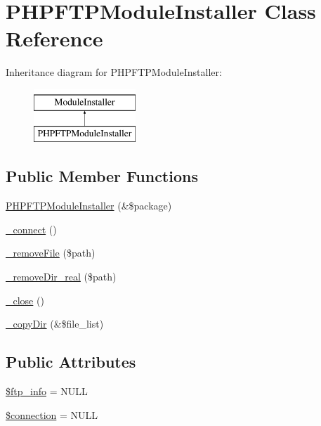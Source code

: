 \hypertarget{classPHPFTPModuleInstaller}{\section{P\-H\-P\-F\-T\-P\-Module\-Installer Class Reference}
\label{classPHPFTPModuleInstaller}
}
Inheritance diagram for P\-H\-P\-F\-T\-P\-Module\-Installer\-:\begin{figure}[H]
\begin{center}
\leavevmode
\includegraphics[height=2.000000cm]{classPHPFTPModuleInstaller}
\end{center}
\end{figure}
\subsection*{Public Member Functions}
\begin{DoxyCompactItemize}
\item 
\hyperlink{classPHPFTPModuleInstaller_a8bd8f79d6614af9e7d28ee497dc9eea1}{P\-H\-P\-F\-T\-P\-Module\-Installer} (\&\$package)
\item 
\hyperlink{classPHPFTPModuleInstaller_a17bd035c8cc7030a56feedf6562de616}{\-\_\-connect} ()
\item 
\hyperlink{classPHPFTPModuleInstaller_a6bfd41813d9f70b9e2ee06deb709742f}{\-\_\-remove\-File} (\$path)
\item 
\hyperlink{classPHPFTPModuleInstaller_abc79bfe0eea3d10f91672313cf8763c0}{\-\_\-remove\-Dir\-\_\-real} (\$path)
\item 
\hyperlink{classPHPFTPModuleInstaller_aa50f708fe4f367338fc95303e9425f83}{\-\_\-close} ()
\item 
\hyperlink{classPHPFTPModuleInstaller_ae9c696b9a99eea744500a23c2f30c81a}{\-\_\-copy\-Dir} (\&\$file\-\_\-list)
\end{DoxyCompactItemize}
\subsection*{Public Attributes}
\begin{DoxyCompactItemize}
\item 
\hyperlink{classPHPFTPModuleInstaller_abaa70235f6af643fc8d90fbecbc1892a}{\$ftp\-\_\-info} = N\-U\-L\-L
\item 
\hyperlink{classPHPFTPModuleInstaller_ab10c7e99865e2ba8ca058987dd81a986}{\$connection} = N\-U\-L\-L
\end{DoxyCompactItemize}


